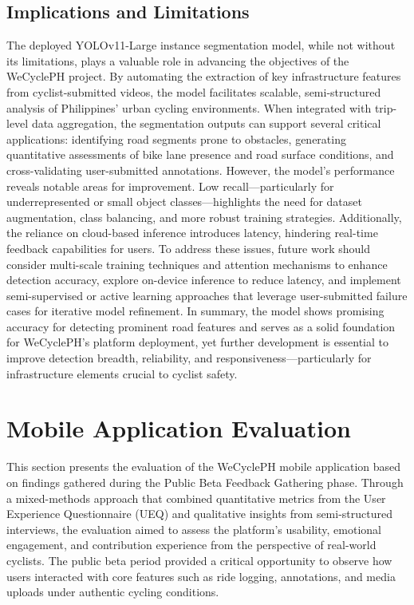 \subsection{Implications and Limitations}
The deployed YOLOv11-Large instance segmentation model, while not without its limitations, plays a valuable role in advancing the objectives of the WeCyclePH project. By automating the extraction of key infrastructure features from cyclist-submitted videos, the model facilitates scalable, semi-structured analysis of Philippines' urban cycling environments. When integrated with trip-level data aggregation, the segmentation outputs can support several critical applications: identifying road segments prone to obstacles, generating quantitative assessments of bike lane presence and road surface conditions, and cross-validating user-submitted annotations. However, the model's performance reveals notable areas for improvement. Low recall—particularly for underrepresented or small object classes—highlights the need for dataset augmentation, class balancing, and more robust training strategies. Additionally, the reliance on cloud-based inference introduces latency, hindering real-time feedback capabilities for users. To address these issues, future work should consider multi-scale training techniques and attention mechanisms to enhance detection accuracy, explore on-device inference to reduce latency, and implement semi-supervised or active learning approaches that leverage user-submitted failure cases for iterative model refinement. In summary, the model shows promising accuracy for detecting prominent road features and serves as a solid foundation for WeCyclePH's platform deployment, yet further development is essential to improve detection breadth, reliability, and responsiveness—particularly for infrastructure elements crucial to cyclist safety.

\section{Mobile Application Evaluation}

This section presents the evaluation of the WeCyclePH mobile application based on findings gathered during the Public Beta Feedback Gathering phase. Through a mixed-methods approach that combined quantitative metrics from the User Experience Questionnaire (UEQ) and qualitative insights from semi-structured interviews, the evaluation aimed to assess the platform's usability, emotional engagement, and contribution experience from the perspective of real-world cyclists. The public beta period provided a critical opportunity to observe how users interacted with core features such as ride logging, annotations, and media uploads under authentic cycling conditions.

